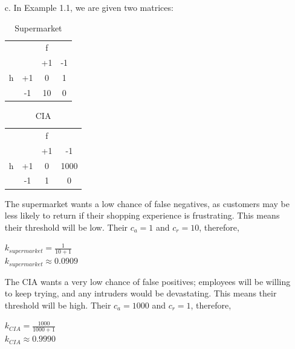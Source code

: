 \documentclass{homework}
\begin{document}
\begin{itemize}
    \item[c.] In Example 1.1, we are given two matrices:
    \begin{table}[H]
        \centering
        \begin{tabular}{lc|cc}
               &  & f & \\
               &  & +1 & -1 \\
            \hline
             h & +1 & 0 & 1 \\
               & -1 & 10 & 0
        \end{tabular}
        \caption{Supermarket}
        \label{tab:placeholder}
    \end{table}
    \begin{table}[H]
        \centering
        \begin{tabular}{lc|cc}
               &  & f & \\
               &  & +1 & -1 \\
            \hline
             h & +1 & 0 & 1000 \\
               & -1 & 1 & 0
        \end{tabular}
        \caption{CIA}
        \label{tab:placeholder}
    \end{table}
    The supermarket wants a low chance of false negatives, as customers may be less likely to return if their shopping experience is frustrating. This means their threshold will be low. Their \(c_a = 1\) and \(c_r = 10\), therefore, 
    \begin{center}
        \(k_{supermarket} = \frac{1}{10 + 1}\) \\
        \(k_{supermarket} \approx 0.0909 \)
    \end{center}
    The CIA wants a very low chance of false positives; employees will be willing to keep trying, and any intruders would be devastating. This means their threshold will be high. Their \(c_a = 1000\) and \(c_r = 1\), therefore, 
    \begin{center}
        \(k_{CIA} = \frac{1000}{1000 + 1}\) \\
        \(k_{CIA} \approx 0.9990 \)
    \end{center}
    
\end{itemize}
\end{document}
